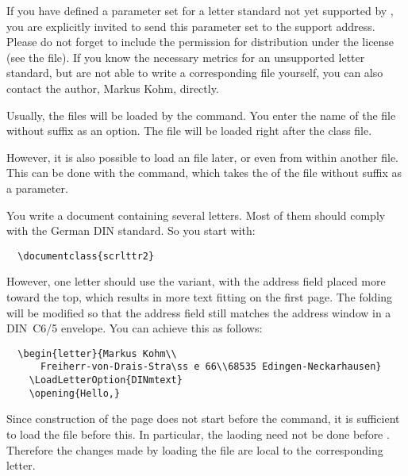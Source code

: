\begin{Explain}
  If you have defined a parameter set for a letter standard not yet
  supported by \KOMAScript, you are explicitly invited to send this
  parameter set to the {\KOMAScript} support address. Please do not
  forget to include the permission for distribution under the
  {\KOMAScript} license (see the  file). If you know
  the necessary metrics for an unsupported letter standard, but are
  not able to write a corresponding  file yourself, you can
  also contact the {\KOMAScript} author, Markus Kohm, directly.
\end{Explain}

\begin{Declaration}
\end{Declaration}
%
Usually, the  files will be loaded by the
 command. You enter the name of the  file
without suffix as an option. The  file will be loaded right
after the class file.

However, it is also possible to load an  file later, or even
from within another  file. This can be done with the
 command, which takes the  of the
 file without suffix as a parameter.
\begin{Example}
You write a document containing several letters. Most of them should
comply with the German DIN standard. So you start with:
\begin{lstlisting}
  \documentclass{scrlttr2}
\end{lstlisting}
However, one letter should use the  variant, with the
address field placed more toward the top, which results in more text
fitting on the first page. The folding will be modified so that the
address field still matches the address window in a DIN~C6/5 envelope.
You can achieve this as follows:
\begin{lstlisting}
  \begin{letter}{Markus Kohm\\
      Freiherr-von-Drais-Stra\ss e 66\\68535 Edingen-Neckarhausen}
    \LoadLetterOption{DINmtext}
    \opening{Hello,}
\end{lstlisting}
Since construction of the page does not start before the
 command, it is sufficient to load the  file
before this. In particular, the laoding need not be done before
. Therefore the changes made by
loading the  file are local to the corresponding letter.
\end{Example}

